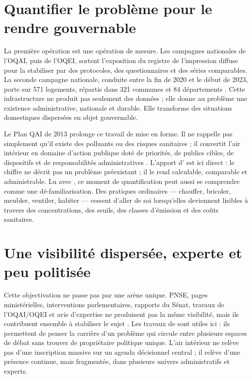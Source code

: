\documentclass[a4paper,12pt,twoside]{book}
\begin{document}
\section{Quantifier le problème pour le rendre gouvernable}

La première opération est une opération de mesure. Les campagnes nationales de l'OQAI, puis de l'OQEI, sortent l'exposition du registre de l'impression diffuse pour la stabiliser par des protocoles, des questionnaires et des séries comparables. La seconde campagne nationale, conduite entre la fin de 2020 et le début de 2023, porte sur 571 logements, répartis dans 321 communes et 84 départements \parencite{OQAI2025CNL1,OQAI2025CNL2}. Cette infrastructure ne produit pas seulement des données ; elle donne au problème une existence administrative, nationale et durable. Elle transforme des situations domestiques dispersées en objet gouvernable.

Le Plan QAI de 2013 prolonge ce travail de mise en forme. Il ne rappelle pas simplement qu'il existe des polluants ou des risques sanitaires ; il convertit l'air intérieur en domaine d'action publique doté de priorités, de publics cibles, de dispositifs et de responsabilités administratives \parencite{PlanQAI2013}. L'apport d'\textcite{Ogien2010ValeurSocialeChiffre} est ici direct : le chiffre ne décrit pas un problème préexistant ; il le rend calculable, comparable et administrable. Lu avec \textcite{Borraz2008PolitiquesRisque}, ce moment de quantification peut aussi se comprendre comme une dé-familiarisation. Des pratiques ordinaires --- chauffer, bricoler, meubler, ventiler, habiter --- cessent d'aller de soi lorsqu'elles deviennent lisibles à travers des concentrations, des seuils, des classes d'émission et des coûts sanitaires.

\section{Une visibilité dispersée, experte et peu politisée}

Cette objectivation ne passe pas par une arène unique. PNSE, pages ministérielles, interventions parlementaires, rapports du Sénat, travaux de l'OQAI/OQEI et avis d'expertise ne produisent pas la même visibilité, mais ils contribuent ensemble à stabiliser le sujet \parencite{PNSE32014Mesures,PNSE42022Rapport,MinistereEcologieQAI2025,QuestionAN2019OQAI,Senat2015CoutInaction}. Les travaux de \textcite{ChailleuxZittoun2021GazSchiste} sont utiles ici : ils permettent de penser la carrière d'un problème qui circule entre plusieurs espaces de débat sans trouver de propriétaire politique unique. L'air intérieur ne relève pas d'une inscription massive sur un agenda décisionnel central ; il relève d'une présence continue, mais fragmentée, dans plusieurs univers administratifs et experts.
\end{document}
